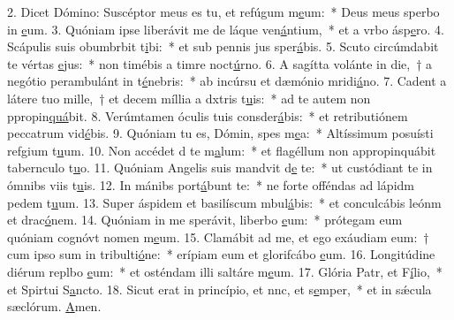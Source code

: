 2. Dicet Dómino: Suscéptor meus es tu, et refúgum m\uline{e}um:~* Deus meus sperbo in \uline{e}um.
3. Quóniam ipse liberávit me de láque ven\uline{á}ntium,~* et a vrbo ásp\uline{e}ro.
4. Scápulis suis obumbrbit t\uline{i}bi:~* et sub pennis jus sper\uline{á}bis.
5. Scuto circúmdabit te vértas \uline{e}jus:~* non timébis a timre noct\uline{ú}rno.
6. A sagítta volánte in die,~† a negótio perambulánt in t\uline{é}nebris:~* ab incúrsu et dæmónio mridi\uline{á}no.
7. Cadent a látere tuo mille,~† et decem míllia a dxtris t\uline{u}is:~* ad te autem non ppropin\uline{quá}bit.
8. Verúmtamen óculis tuis consder\uline{á}bis:~* et retributiónem peccatrum vid\uline{é}bis.
9. Quóniam tu es, Dómin, spes m\uline{e}a:~* Altíssimum posuísti refgium t\uline{u}um.
10. Non accédet d te m\uline{a}lum:~* et flagéllum non appropinquábit tabernculo t\uline{u}o.
11. Quóniam Angelis suis mandvit d\uline{e} te:~* ut custódiant te in ómnibs viis t\uline{u}is.
12. In mánibs port\uline{á}bunt te:~* ne forte offéndas ad lápidm pedem t\uline{u}um.
13. Super áspidem et basilíscum mbul\uline{á}bis:~* et conculcábis leónm et drac\uline{ó}nem.
14. Quóniam in me sperávit, liberbo \uline{e}um:~* prótegam eum quóniam cognóvt nomen m\uline{e}um.
15. Clamábit ad me, et ego exáudiam eum:~† cum ipso sum in tribulti\uline{ó}ne:~* erípiam eum et glorifcábo \uline{e}um.
16. Longitúdine diérum replbo \uline{e}um:~* et osténdam illi saltáre m\uline{e}um.
17. Glória Patr, et F\uline{í}lio,~* et Spirtui S\uline{a}ncto.
18. Sicut erat in princípio, et nnc, et s\uline{e}mper,~* et in sǽcula sæclórum. \uline{A}men.

